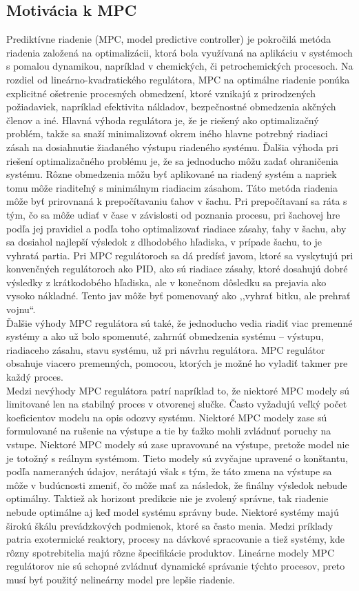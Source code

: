 \subsection*{Motivácia k MPC}
Prediktívne riadenie (MPC, model predictive controller) je pokročilá metóda riadenia založená na optimalizácii, ktorá bola využívaná na aplikáciu v systémoch s pomalou dynamikou, napríklad v chemických, či petrochemických procesoch. Na rozdiel od lineárno-kvadratického regulátora, MPC na optimálne riadenie ponúka explicitné ošetrenie procesných obmedzení, ktoré vznikajú z prirodzených požiadaviek, napríklad efektivita nákladov, bezpečnostné obmedzenia akčných členov a iné.\cite{MPC01} \newline
\indent Hlavná výhoda regulátora je, že je riešený ako optimalizačný problém, takže sa snaží minimalizovať okrem iného hlavne potrebný riadiaci zásah na dosiahnutie žiadaného výstupu riadeného systému. Ďalšia výhoda pri riešení optimalizačného problému je, že sa jednoducho môžu zadať ohraničenia systému. Rôzne obmedzenia môžu byť aplikované na riadený systém a napriek tomu môže riaditeľný s minimálnym riadiacim zásahom. Táto metóda riadenia môže byť prirovnaná k prepočítavaniu ťahov v šachu. Pri prepočítavaní sa ráta s tým, čo sa môže udiať v čase v závislosti od poznania procesu, pri šachovej hre podľa jej pravidiel a podľa toho optimalizovať riadiace zásahy, ťahy v šachu, aby sa dosiahol najlepší výsledok z dlhodobého hľadiska, v prípade šachu, to je vyhratá partia. Pri MPC regulátoroch sa dá predísť javom, ktoré sa vyskytujú pri konvenčných regulátoroch ako PID, ako sú riadiace zásahy, ktoré dosahujú dobré výsledky z krátkodobého hľadiska, ale v konečnom dôsledku sa prejavia ako vysoko nákladné. Tento jav môže byť pomenovaný ako ,,vyhrať bitku, ale prehrať vojnu``. \\ 
\indent Ďalšie výhody MPC regulátora sú také, že jednoducho vedia riadiť viac premenné systémy a ako už bolo spomenuté, zahrnúť obmedzenia systému – výstupu, riadiaceho zásahu, stavu systému, už pri návrhu regulátora. MPC regulátor obsahuje viacero premenných, pomocou, ktorých je možné ho vyladiť takmer pre každý proces. \\
\indent Medzi nevýhody MPC regulátora patrí napríklad to, že niektoré MPC modely sú limitované len na stabilný proces v otvorenej slučke. Často vyžadujú veľký počet koeficientov modelu na opis odozvy systému. Niektoré MPC modely zase sú formulované na  rušenie na výstupe a tie by ťažko mohli zvládnuť poruchy na vstupe. Niektoré MPC modely sú zase upravované na výstupe, pretože model nie je totožný s reálnym systémom. Tieto modely sú zvyčajne upravené o konštantu, podľa nameraných údajov, nerátajú však s tým, že táto zmena na výstupe sa môže v budúcnosti zmeniť, čo môže mať za následok, že finálny výsledok nebude optimálny. Taktiež ak horizont predikcie nie je zvolený správne, tak riadenie nebude optimálne aj keď model systému správny bude. Niektoré systémy majú širokú škálu prevádzkových podmienok, ktoré sa často menia. Medzi príklady patria exotermické reaktory, procesy na dávkové spracovanie a tiež systémy, kde rôzny spotrebitelia majú rôzne špecifikácie produktov. Lineárne modely MPC regulátorov nie sú schopné zvládnuť dynamické správanie týchto procesov, preto musí byť použitý nelineárny model pre lepšie riadenie.\cite{MPC02} 
